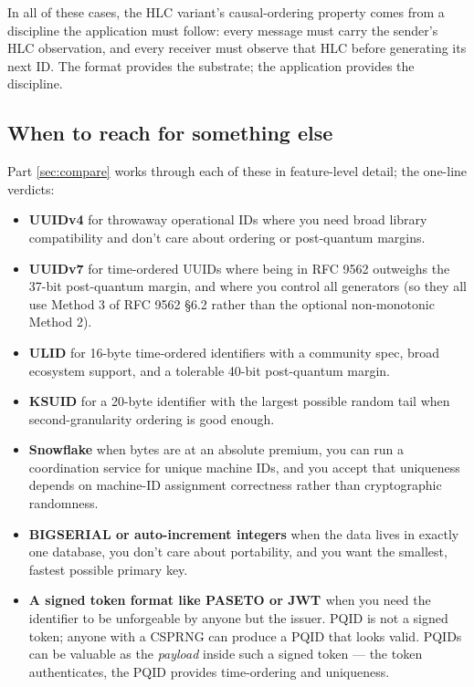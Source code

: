 In all of these cases, the HLC variant's causal-ordering property comes from a discipline the application must follow: every message must carry the sender's HLC observation, and every receiver must observe that HLC before generating its next ID. The format provides the substrate; the application provides the discipline.

\subsection{When to reach for something else}

Part \ref{sec:compare} works through each of these in feature-level detail; the one-line verdicts:

\begin{itemize}
  \item \textbf{UUIDv4} for throwaway operational IDs where you need broad library compatibility and don't care about ordering or post-quantum margins.
  \item \textbf{UUIDv7} for time-ordered UUIDs where being in RFC 9562 outweighs the 37-bit post-quantum margin, and where you control all generators (so they all use Method 3 of RFC 9562 §6.2 rather than the optional non-monotonic Method 2).
  \item \textbf{ULID} for 16-byte time-ordered identifiers with a community spec, broad ecosystem support, and a tolerable 40-bit post-quantum margin.
  \item \textbf{KSUID} for a 20-byte identifier with the largest possible random tail when second-granularity ordering is good enough.
  \item \textbf{Snowflake} when bytes are at an absolute premium, you can run a coordination service for unique machine IDs, and you accept that uniqueness depends on machine-ID assignment correctness rather than cryptographic randomness.
  \item \textbf{BIGSERIAL or auto-increment integers} when the data lives in exactly one database, you don't care about portability, and you want the smallest, fastest possible primary key.
  \item \textbf{A signed token format like PASETO \citep{paseto} or JWT \citep{rfc7519}} when you need the identifier to be unforgeable by anyone but the issuer. PQID is not a signed token; anyone with a CSPRNG can produce a PQID that looks valid. PQIDs can be valuable as the \emph{payload} inside such a signed token --- the token authenticates, the PQID provides time-ordering and uniqueness.
\end{itemize}

